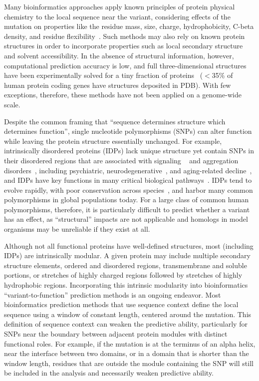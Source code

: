 \documentclass[10pt,letterpaper]{article}
\begin{document}
Many bioinformatics approaches apply known principles of protein physical chemistry to the local sequence near the variant, considering effects of the mutation on properties like the residue mass, size, charge, hydrophobicity, C-beta density, and residue flexibility~\cite{Hecht2015, needed}.  Such methods may also rely on known protein structures in order to incorporate properties such as local secondary structure and solvent accessibility. In the absence of structural information, however, computational prediction accuracy is low, and full three-dimensional structures have been experimentally solved for a tiny fraction of proteins~\cite{Mir2017,Rose2016} ($<$35\% of human protein coding genes have structures deposited in PDB\cite{Prlic2016}). With few exceptions, therefore, these methods have not been applied on a genome-wide scale.

Despite the common framing that “sequence determines structure which determines function”, single nucleotide polymorphisms (SNPs) can alter function while leaving the protein structure essentially unchanged. For example, intrinsically disordered proteins (IDPs) lack unique structure yet contain SNPs in their disordered regions that are associated with signaling ~\cite{Uverskya,Deiana2016} and aggregation disorders~\cite{Patel2015,Uversky2015}, including psychiatric\cite{needed}, neurodegenerative~\cite{Weinreb1996}, and aging-related decline~\cite{CuanaloContreras2013}, and IDPs have key functions in many critical biological pathways~\cite {Uversky2013a,Panchenko2015,Ward2004a,Dyson2005a,Uversky2019}. IDPs tend to evolve rapidly, with poor conservation across species~\cite{Brown2011}, and harbor many common polymorphisms in global populations today. For a large class of common human polymorphisms, therefore, it is particularly difficult to predict whether a variant has an effect, as ``structural'' impacts are not applicable and homologs in model organisms may be unreliable if they exist at all.

Although not all functional proteins have well-defined structures, most (including IDPs) are intrinsically modular. A given protein may include multiple secondary structure elements, ordered and disordered regions, transmembrane and soluble portions, or stretches of highly charged regions followed by stretches of highly hydrophobic regions. Incorporating this intrinsic modularity into bioinformatics ``variant-to-function'' prediction methods is an ongoing endeavor. Most bioinformatics prediction methods that use sequence context define the local sequence using a window of constant length, centered around the mutation. This definition of sequence context can weaken the predictive ability, particularly for SNPs near the boundary between adjacent protein modules with distinct functional roles. For example, if the mutation is at the terminus of an alpha helix, near the interface between two domains, or in a domain that is shorter than the window length, residues that are outside the module containing the SNP will still be included in the analysis and necessarily weaken predictive ability.
\end{document}
